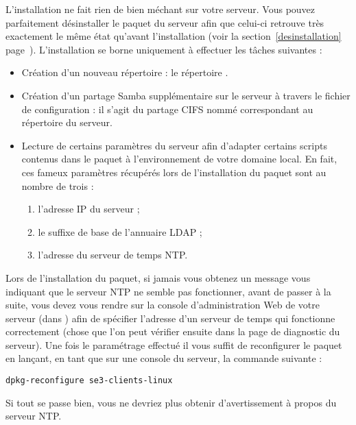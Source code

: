 L'installation ne fait rien de bien méchant sur votre
serveur. Vous pouvez parfaitement désinstaller le
paquet du serveur afin que celui-ci retrouve très exactement
le même état qu'avant l'installation (voir la section~\ref{desinstallation}
page~\pageref{desinstallation}).
L'installation se borne uniquement à effectuer les tâches suivantes :
%
\begin{itemize}
\item Création d'un nouveau répertoire : le répertoire .

\item Création d'un partage Samba supplémentaire sur le serveur à travers
le fichier de configuration  : il s'agit du
partage CIFS nommé  correspondant au répertoire
 du serveur.

\item Lecture de certains paramètres du serveur afin d'adapter certains scripts
contenus dans le
paquet  à l'environnement
de votre domaine local. En fait, ces fameux paramètres récupérés lors
de l'installation du paquet sont au
nombre de trois :
\begin{enumerate}
\item l'adresse IP du serveur ;
\item le suffixe de base de l'annuaire LDAP ;
\item l'adresse du serveur de temps NTP.
\end{enumerate}
\end{itemize}

\begin{alerte}
Lors de l'installation du paquet, si jamais vous obtenez un message
vous indiquant que le serveur NTP ne semble pas fonctionner, avant
de passer à la suite, vous devez vous rendre sur la console d'administration
Web de votre serveur (dans 
\Vers {}) afin de spécifier l'adresse d'un
serveur de temps qui fonctionne correctement
(chose que l'on peut vérifier ensuite dans la page de diagnostic du serveur).
Une fois le paramétrage effectué il vous suffit de reconfigurer le paquet
en lançant, en tant que  sur une console du serveur,
la commande suivante :
%
\begin{lstlisting}
dpkg-reconfigure se3-clients-linux
\end{lstlisting}
%
Si tout se passe bien, vous ne devriez plus obtenir d'avertissement
à propos du serveur NTP.
\end{alerte}

